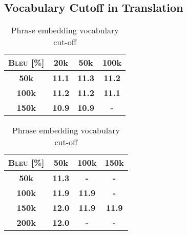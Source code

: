 \subsection{Vocabulary Cutoff in Translation}
\begin{table}[h]
	\parbox{.5\linewidth}{
		\centering
		\caption{Word embedding vocabulary cut-off}
		\begin{tabular}{>{\bfseries}c >{\bfseries}c >{\bfseries}c >{\bfseries}c } 
			\hline
			\textsc{Bleu} [\%]	& 20k & 50k & 100k \\
			\hline
			50k &	11.1  & \leavevmode\color{blue}11.3 & 11.2  \\ 
			\hline
			100k&	11.2  & 11.2 & 11.1 \\ 			
			\hline
			150k&	10.9 & 10.9 & - \\
			\hline
		\end{tabular}
		
	}
	\hfill
	\parbox{.5\linewidth}{
		\centering
		\caption{Phrase embedding vocabulary cut-off}
		\begin{tabular}{>{\bfseries}c >{\bfseries}c >{\bfseries}c >{\bfseries}c } 
			\hline
			\textsc{Bleu} [\%]	& 50k & 100k & 150k \\
			\hline
			50k &	11.3  & - & -  \\ 
			\hline
			100k&	11.9  & 11.9 & - \\ 			
			\hline
			150k&	\leavevmode\color{blue}12.0 & 11.9 & 11.9 \\
			\hline
			200k & 12.0 & - & - \\
			\hline
		\end{tabular}
		
	}
\end{table}
